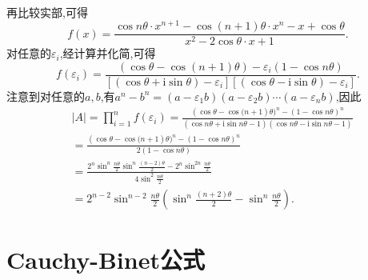 \documentclass[lang=cn,newtx,10pt,scheme=chinese]{elegantbook}
\begin{document}
\begin{solution}
\begin{align*}
\end{align*}
再比较实部,可得
\[
f(x)=\frac{\cos n\theta\cdot x^{n + 1}-\cos(n + 1)\theta\cdot x^n - x+\cos\theta}{x^2 - 2\cos\theta\cdot x + 1}.
\]
对任意的\(\varepsilon_i\),经计算并化简,可得
\[
f(\varepsilon _i)=\frac{\left( \cos \theta -\cos \left( n+1 \right) \theta \right) -\varepsilon _i\left( 1-\cos n\theta \right)}{\left[ \left( \cos \theta +\mathrm{i}\sin \theta \right) -\varepsilon _i \right] \left[ \left( \cos \theta -\mathrm{i}\sin \theta \right) -\varepsilon _i \right]}.
\]
注意到对任意的\(a,b\),有\(a^n - b^n=(a - \varepsilon_1b)(a - \varepsilon_2b)\cdots(a - \varepsilon_nb)\),因此
\begin{align*}
&\left| A \right|=\prod_{i=1}^n{f(\varepsilon _i)}=\frac{(\cos \theta -\cos\mathrm{(}n+1)\theta )^n-(1-\cos n\theta )^n}{(\cos n\theta +\mathrm{i}\sin n\theta -1)(\cos n\theta -\mathrm{i}\sin n\theta -1)}
\\
&=\frac{(\cos \theta -\cos\mathrm{(}n+1)\theta )^n-(1-\cos n\theta )^n}{2(1-\cos n\theta )}
\\
&=\frac{2^n\sin ^n\frac{n\theta}{2}\sin ^n\frac{\left( n-2 \right) \theta}{2}-2^n\sin ^{2n}\frac{n\theta}{2}}{4\sin ^2\frac{n\theta}{2}}
\\
&=2^{n-2}\sin ^{n-2}\frac{n\theta}{2}\left( \sin ^n\frac{(n+2)\theta}{2}-\sin ^n\frac{n\theta}{2} \right) .
\end{align*}
\end{solution}

\section{Cauchy-Binet公式}
\end{document}
